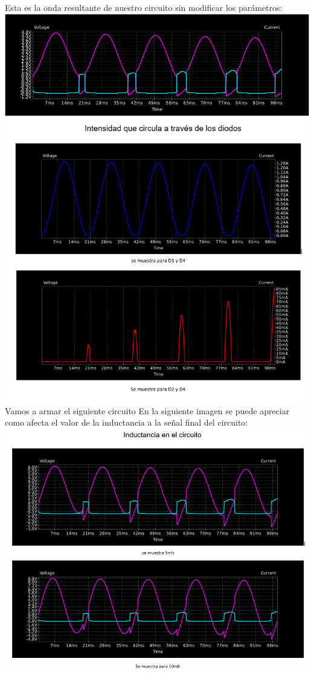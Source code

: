 \documentclass[12pt,a4paper]{article}
\begin{document}
\begin{flushleft}
Esta es la onda resultante de nuestro circuito sin modificar los parámetros:\\
\includegraphics[scale=0.5]{imagenes/p3/practica12.png} 
\\
\includegraphics[scale=0.9]{imagenes/p3/dio/diofin.PNG} 
Vamos a armar el siguiente circuito
\newpage
En la siguiente imagen se puede apreciar como afecta el valor de la inductancia a la señal final del circuito:\\
\includegraphics[scale=0.8]{imagenes/p3/lr/Inductanciafinal.PNG} 
\end{flushleft}
\newpage
\end{document}
